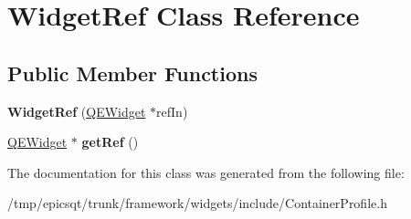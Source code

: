 \hypertarget{classWidgetRef}{
\section{WidgetRef Class Reference}
\label{classWidgetRef}
}
\subsection*{Public Member Functions}
\begin{DoxyCompactItemize}
\item 
\hypertarget{classWidgetRef_ae7d049fe5347fdb03912cdb70f321432}{
{\bfseries WidgetRef} (\hyperlink{classQEWidget}{QEWidget} $\ast$refIn)}
\label{classWidgetRef_ae7d049fe5347fdb03912cdb70f321432}

\item 
\hypertarget{classWidgetRef_aa96360f71db58335a38920ce60d9594d}{
\hyperlink{classQEWidget}{QEWidget} $\ast$ {\bfseries getRef} ()}
\label{classWidgetRef_aa96360f71db58335a38920ce60d9594d}

\end{DoxyCompactItemize}


The documentation for this class was generated from the following file:\begin{DoxyCompactItemize}
\item 
/tmp/epicsqt/trunk/framework/widgets/include/ContainerProfile.h\end{DoxyCompactItemize}
